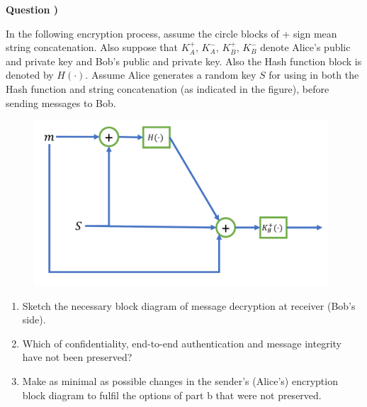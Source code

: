 \documentclass{article}
\newcounter{questionnumber}
\newcommand{\Q}{
\textbf{Question \thequestionnumber)}
\stepcounter{questionnumber}
}
\begin{document}
\newpage

\Q

In the following encryption process, assume the circle blocks of + sign mean string concatenation. Also suppose that $K_A^+$, $K_A^-$, $K_B^+$, $K_B^-$ denote Alice's public and private key and Bob's public and private key. Also the Hash function block is denoted by $H(\cdot)$. Assume Alice generates a random key $S$ for using in both the Hash function and string concatenation (as indicated in the figure), before sending messages to Bob.
\begin{figure}[htbp]
\centering
\includegraphics[width=110mm]{q6_1.pdf}
\end{figure}
\begin{enumerate}[label=\alph*)]
\item
Sketch the necessary block diagram of message decryption at receiver (Bob's side).
\item
Which of confidentiality, end-to-end authentication and message integrity have not been preserved?
\item
Make as minimal as possible changes in the sender's (Alice's) encryption block diagram to fulfil the options of part b that were not preserved.
\end{enumerate}

%
%
%

\newpage
\end{document}
